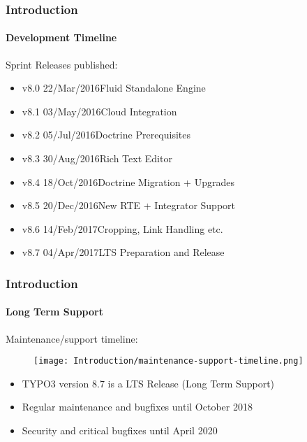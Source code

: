 \begin{frame}[fragile]
	\frametitle{Introduction}
	\framesubtitle{Development Timeline}

	Sprint Releases published:

	\begin{itemize}
		\item v8.0 \tabto{1.1cm}22/Mar/2016\tabto{3.4cm}Fluid Standalone Engine
		\item v8.1 \tabto{1.1cm}03/May/2016\tabto{3.4cm}Cloud Integration
		\item v8.2 \tabto{1.1cm}05/Jul/2016\tabto{3.4cm}Doctrine Prerequisites
		\item v8.3 \tabto{1.1cm}30/Aug/2016\tabto{3.4cm}Rich Text Editor
		\item v8.4 \tabto{1.1cm}18/Oct/2016\tabto{3.4cm}Doctrine Migration + Upgrades
		\item v8.5 \tabto{1.1cm}20/Dec/2016\tabto{3.4cm}New RTE + Integrator Support
		\item v8.6 \tabto{1.1cm}14/Feb/2017\tabto{3.4cm}Cropping, Link Handling etc.
		\item v8.7 \tabto{1.1cm}04/Apr/2017\tabto{3.4cm}LTS Preparation and Release
	\end{itemize}

\end{frame}

\begin{frame}[fragile]
	\frametitle{Introduction}
	\framesubtitle{Long Term Support}

	Maintenance/support timeline:

	\begin{figure}
		\texttt{[image: Introduction/maintenance-support-timeline.png]}
	\end{figure}

	\begin{itemize}
		\item TYPO3 version 8.7 is a LTS Release (Long Term Support)
		\item Regular maintenance and bugfixes until October 2018
		\item Security and critical bugfixes until April 2020
	\end{itemize}

\end{frame}

